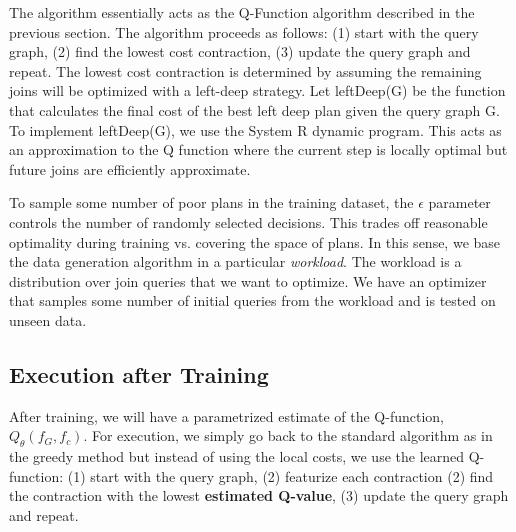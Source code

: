 The algorithm essentially acts as the Q-Function algorithm described in the previous section. The algorithm proceeds as follows: (1) start with the query graph, (2) find the lowest cost contraction, (3) update the query graph and repeat. The lowest cost contraction is determined by assuming the remaining joins will be optimized with a left-deep strategy.
Let \textsf{leftDeep}(G) be the function that calculates the final cost of the best left deep plan given the query graph G.
To implement \textsf{leftDeep}(G), we use the System R dynamic program. 
This acts as an approximation to the Q function where the current step is locally optimal but future joins are efficiently approximate. {}

To sample some number of poor plans in the training dataset, the $\epsilon$ parameter controls the number of randomly selected decisions.
This trades off reasonable optimality during training vs. covering the space of plans.
In this sense, we base the data generation algorithm in a particular \emph{workload}. The workload is a distribution over join queries that we want to optimize. 
We have an optimizer that samples some number of initial queries from the workload and is tested on unseen data.

\subsection{Execution after Training}
After training, we will have a parametrized estimate of the Q-function, $Q_\theta(f_G,f_c)$. For execution, we simply go back to the standard algorithm as in the greedy method but instead of using the local costs, we use the learned Q-function: (1) start with the query graph, (2) featurize each contraction (2) find the contraction with the lowest \textbf{estimated Q-value}, (3) update the query graph and repeat.
